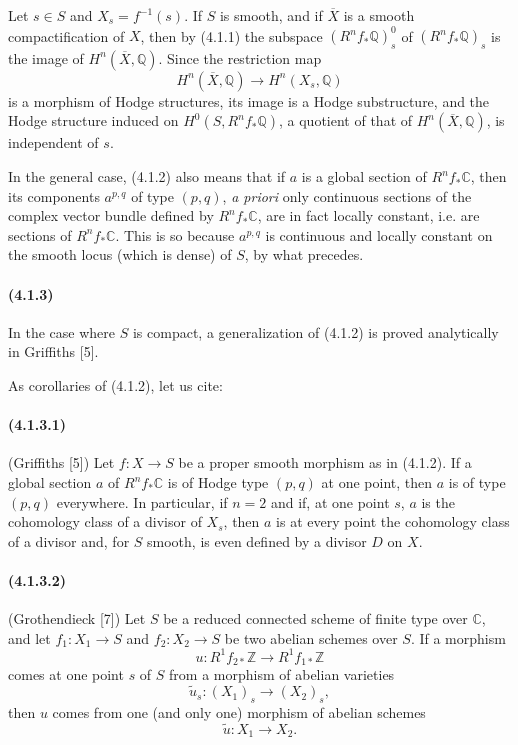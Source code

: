 \documentclass[10pt]{article}
\newcommand{\C}{\mathbb C}
\newcommand{\Q}{\mathbb Q}
\newcommand{\Z}{\mathbb Z}
\begin{document}
Let $s\in S$ and $X_s=f^{-1}(s)$. If $S$ is smooth, and if $\overline X$ is a smooth compactification of $X$, then by (4.1.1) the subspace $(R^nf_*\Q)^0_s$ of $(R^nf_*\Q)_s$ is the image of $H^n(\overline X,\Q)$. Since the restriction map
\[
H^n(\overline X,\Q)\longrightarrow H^n(X_s,\Q)
\]
is a morphism of Hodge structures, its image is a Hodge substructure, and the Hodge structure induced on $H^0(S,R^nf_*\Q)$, a quotient of that of $H^n(\overline X,\Q)$, is independent of $s$.

In the general case, (4.1.2) also means that if $a$ is a global section of $R^nf_*\C$, then its components $a^{p,q}$ of type $(p,q)$, \emph{a priori} only continuous sections of the complex vector bundle defined by $R^nf_*\C$, are in fact locally constant, i.e. are sections of $R^nf_*\C$. This is so because $a^{p,q}$ is continuous and locally constant on the smooth locus (which is dense) of $S$, by what precedes.

\paragraph{(4.1.3)} In the case where $S$ is compact, a generalization of (4.1.2) is proved analytically in Griffiths [5].

As corollaries of (4.1.2), let us cite:

\paragraph{(4.1.3.1)} (Griffiths [5]) Let $f:X\to S$ be a proper smooth morphism as in (4.1.2). If a global section $a$ of $R^nf_*\C$ is of Hodge type $(p,q)$ at one point, then $a$ is of type $(p,q)$ everywhere. In particular, if $n=2$ and if, at one point $s$, $a$ is the cohomology class
of a divisor of $X_s$, then $a$ is at every point the cohomology class of a divisor and, for $S$ smooth, is even defined by a divisor $D$ on $X$.

\paragraph{(4.1.3.2)} (Grothendieck [7]) Let $S$ be a reduced connected scheme of finite type over $\C$, and let $f_1:X_1\to S$ and $f_2:X_2\to S$ be two abelian schemes over $S$. If a morphism
\[
u:R^1f_{2*}\Z\longrightarrow R^1f_{1*}\Z
\]
comes at one point $s$ of $S$ from a morphism of abelian varieties
\[
\widetilde u_s:(X_1)_s\longrightarrow (X_2)_s,
\]
then $u$ comes from one (and only one) morphism of abelian schemes
\[
\widetilde u:X_1\longrightarrow X_2.
\]
\end{document}
